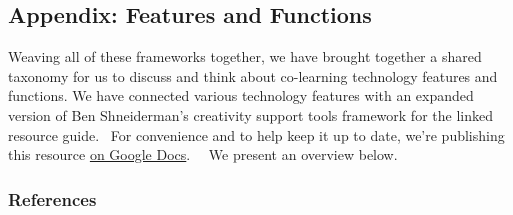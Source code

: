 \subsection{Appendix: Features and
Functions}\label{appendix-features-and-functions}

Weaving all of these frameworks together, we have brought together a
shared taxonomy for us to discuss and think about co-learning technology
features and functions. We have connected various technology features
with an expanded version of Ben Shneiderman's creativity support tools
framework for the linked resource guide.~ For convenience and to help
keep it up to date, we're publishing this resource
\href{http://goo.gl/H02fMA}{on Google Docs}.~~ We present an overview
below.

\subsubsection{References}\label{technologies-references}

